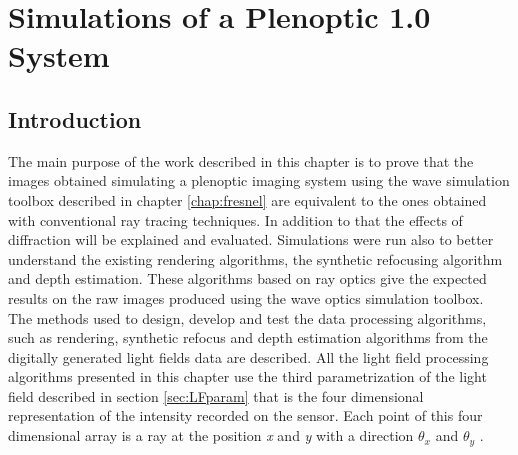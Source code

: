 \chapter{Simulations of a Plenoptic 1.0 System}
\label{chap:chapter4}
\section{Introduction}
\label{sec:intro3}
The main purpose of the work described in this chapter is to prove that the images obtained simulating a plenoptic imaging system using the wave simulation toolbox described in chapter \ref{chap:fresnel} are equivalent to the ones obtained with conventional ray tracing techniques. In addition to that the effects of diffraction will be explained and evaluated. Simulations were run also to better understand the existing rendering algorithms, the synthetic refocusing algorithm and depth estimation. These algorithms based on ray optics give the expected results on the raw images produced using the wave optics simulation toolbox.
The methods used to design, develop and test the data processing algorithms, such as rendering, synthetic refocus and depth estimation algorithms from the digitally generated light fields data are described. All the light field processing algorithms presented in this chapter use the third parametrization of the light field described in section \ref{sec:LFparam} that is the four dimensional representation of the intensity recorded on the sensor. Each point of this four dimensional array is a ray at the position \textit{x} and \textit{y} with a direction $\theta_x$ and $\theta_y$ \cite{ng2006digital,georgiev2010focused}.
